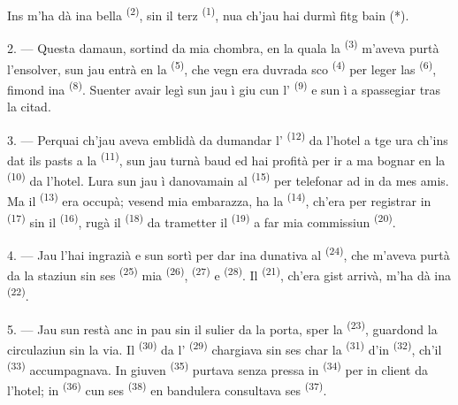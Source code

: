 Ins m'ha dà ina bella  \textsuperscript{(2)}, sin il terz 
\textsuperscript{(1)}, nua ch'jau hai durmì fitg bain (*).

2. --- Questa damaun, sortind da mia chombra, en la quala la 
\textsuperscript{(3)} m'aveva purtà l'ensolver, sun jau entrà en la  \textsuperscript{(5)}, che vegn era duvrada sco 
\textsuperscript{(4)} per leger las  \textsuperscript{(6)}, fimond ina
 \textsuperscript{(8)}. Suenter avair legì sun jau ì giu cun
l' \textsuperscript{(9)} e sun ì a spassegiar tras la citad.

3. --- Perquai ch'jau aveva emblidà da dumandar l' \textsuperscript{(12)}
da l'hotel a tge ura ch'ins dat ils pasts a la 
\textsuperscript{(11)}, sun jau turnà baud ed hai profità per ir a ma bognar en la
 \textsuperscript{(10)} da l'hotel. Lura sun jau ì danovamain al
 \textsuperscript{(15)} per telefonar ad in da mes amis. Ma il
 \textsuperscript{(13)} era occupà; vesend mia embarazza, ha la
 \textsuperscript{(14)}, ch'era per registrar in 
\textsuperscript{(17)} sin il  \textsuperscript{(16)}, rugà il
 \textsuperscript{(18)} da trametter il  \textsuperscript{(19)} a far
mia commissiun  \textsuperscript{(20)}.

4. --- Jau l'hai ingrazià e sun sortì per dar ina dunativa al 
\textsuperscript{(24)}, che m'aveva purtà da la staziun sin ses 
\textsuperscript{(25)} mia  \textsuperscript{(26)},  \textsuperscript{(27)} e  \textsuperscript{(28)}. Il
 \textsuperscript{(21)}, ch'era gist arrivà, m'ha dà ina
 \textsuperscript{(22)}.

5. --- Jau sun restà anc in pau sin il sulier da la porta, sper la  \textsuperscript{(23)}, guardond la circulaziun sin la via. Il 
\textsuperscript{(30)} da l' \textsuperscript{(29)} chargiava sin ses char la
 \textsuperscript{(31)} d'in  \textsuperscript{(32)}, ch'il
 \textsuperscript{(33)} accumpagnava. In giuven 
\textsuperscript{(35)} purtava senza pressa in  \textsuperscript{(34)} per in
client da l'hotel; in  \textsuperscript{(36)} cun ses  \textsuperscript{(38)} en bandulera consultava ses 
\textsuperscript{(37)}.


